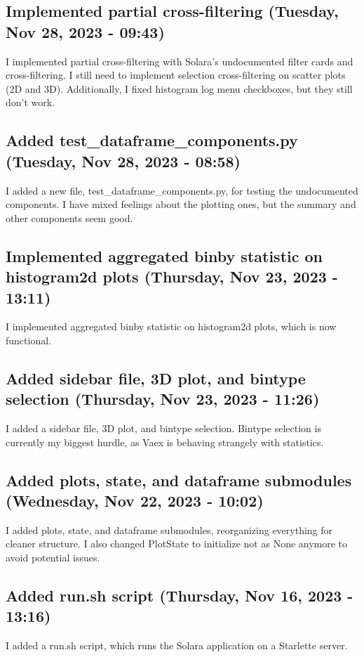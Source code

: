 \documentclass[a4paper]{article}
\begin{document}
\subsection*{Implemented partial cross-filtering (Tuesday, Nov 28, 2023 - 09:43)}
I implemented partial cross-filtering with Solara's undocumented filter cards and cross-filtering. I still need to implement selection cross-filtering on scatter plots (2D and 3D). Additionally, I fixed histogram log menu checkboxes, but they still don't work.

\subsection*{Added test\_dataframe\_components.py (Tuesday, Nov 28, 2023 - 08:58)}
I added a new file, test\_dataframe\_components.py, for testing the undocumented components. I have mixed feelings about the plotting ones, but the summary and other components seem good.

\subsection*{Implemented aggregated binby statistic on histogram2d plots (Thursday, Nov 23, 2023 - 13:11)}
I implemented aggregated binby statistic on histogram2d plots, which is now functional.

\subsection*{Added sidebar file, 3D plot, and bintype selection (Thursday, Nov 23, 2023 - 11:26)}
I added a sidebar file, 3D plot, and bintype selection. Bintype selection is currently my biggest hurdle, as Vaex is behaving strangely with statistics.

\subsection*{Added plots, state, and dataframe submodules (Wednesday, Nov 22, 2023 - 10:02)}
I added plots, state, and dataframe submodules, reorganizing everything for cleaner structure. I also changed PlotState to initialize not as None anymore to avoid potential issues.

\subsection*{Added run.sh script (Thursday, Nov 16, 2023 - 13:16)}
I added a run.sh script, which runs the Solara application on a Starlette server.
\end{document}
